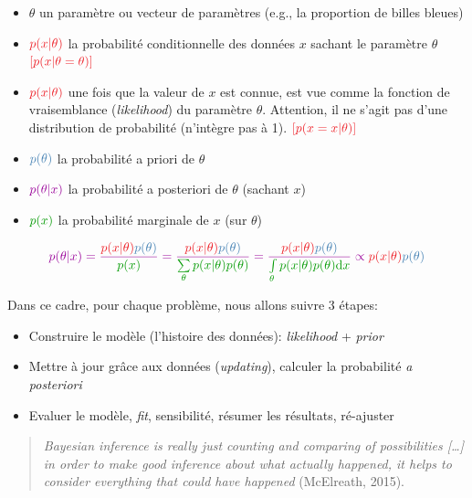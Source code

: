 \documentclass[
  a4paper,11pt,twoside,onecolumn,openright,final,oldfontcommands]{memoir}
\providecommand{\tightlist}{%
  \setlength{\itemsep}{0pt}\setlength{\parskip}{0pt}}
\theoremstyle{definition}
\theoremstyle{definition}
\theoremstyle{definition}
\theoremstyle{remark}
\begin{document}
\begin{itemize}
\tightlist
\item
  \(\theta\) un paramètre ou vecteur de paramètres (e.g., la proportion de billes bleues)
\item
  \(\color{orangered}{p(x\vert \theta)}\) { la probabilité conditionnelle des données \(x\) sachant le paramètre \(\theta\) } \(\color{orangered}{[p(x | \theta = \theta)]}\)
\item
  \(\color{orangered}{p(x\vert \theta)}\) { une fois que la valeur de \(x\) est connue, est vue comme la fonction de vraisemblance (\emph{likelihood}) du paramètre \(\theta\). Attention, il ne s'agit pas d'une distribution de probabilité (n'intègre pas à 1). } \(\color{orangered}{[p(x = x | \theta)]}\)
\item
  \(\color{steelblue}{p(\theta)}\) { la probabilité a priori de \(\theta\)}
\item
  \(\color{purple}{p(\theta \vert x)}\) { la probabilité a posteriori de \(\theta\) (sachant \(x\))}
\item
  \(\color{green}{p(x)}\) { la probabilité marginale de \(x\) (sur \(\theta\))}
\end{itemize}

\[
\color{purple}{p(\theta \vert x)} = \dfrac{\color{orangered}{p(x\vert \theta)} \color{steelblue}{p(\theta)}}{\color{green}{p(x)}} = \dfrac{\color{orangered}{p(x\vert \theta)} \color{steelblue}{p(\theta)}}{\color{green}{\sum\limits_{\theta}p(x|\theta)p(\theta)}} = \dfrac{\color{orangered}{p(x\vert \theta)} \color{steelblue}{p(\theta)}}{\color{green}{\int\limits_{\theta}p(x|\theta)p(\theta)\mathrm{d}x}} \propto \color{orangered}{p(x\vert \theta)} \color{steelblue}{p(\theta)}
\]

Dans ce cadre, pour chaque problème, nous allons suivre 3 étapes:

\begin{itemize}
\tightlist
\item
  Construire le modèle (l'histoire des données): \emph{likelihood} + \emph{prior}
\item
  Mettre à jour grâce aux données (\emph{updating}), calculer la probabilité \emph{a posteriori}
\item
  Evaluer le modèle, \emph{fit}, sensibilité, résumer les résultats, ré-ajuster
\end{itemize}

\begin{quote}
\emph{Bayesian inference is really just counting and comparing of possibilities {[}\ldots{]} in order to make good inference about what actually happened, it helps to consider everything that could have happened} (McElreath, 2015).
\end{quote}
\end{document}
